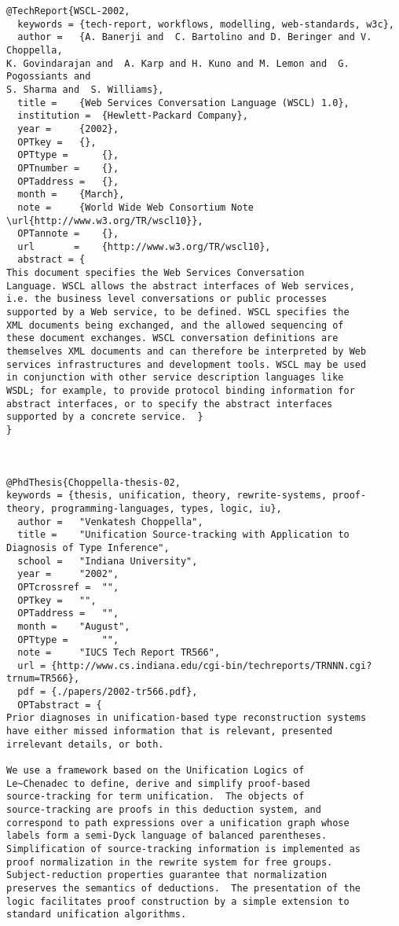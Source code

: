 \documentclass[11pt]{article}
\begin{document}
\begin{lstlisting}
@TechReport{WSCL-2002,
  keywords = {tech-report, workflows, modelling, web-standards, w3c},
  author = 	 {A. Banerji and  C. Bartolino and D. Beringer and V. Choppella,
K. Govindarajan and  A. Karp and H. Kuno and M. Lemon and  G. Pogossiants and
S. Sharma and  S. Williams},
  title = 	 {Web Services Conversation Language (WSCL) 1.0},
  institution =  {Hewlett-Packard Company},
  year = 	 {2002},
  OPTkey = 	 {},
  OPTtype = 	 {},
  OPTnumber = 	 {},
  OPTaddress = 	 {},
  month = 	 {March},
  note = 	 {World Wide Web Consortium Note \url{http://www.w3.org/TR/wscl10}},
  OPTannote = 	 {},
  url       =    {http://www.w3.org/TR/wscl10},
  abstract = {
This document specifies the Web Services Conversation
Language. WSCL allows the abstract interfaces of Web services,
i.e. the business level conversations or public processes
supported by a Web service, to be defined. WSCL specifies the
XML documents being exchanged, and the allowed sequencing of
these document exchanges. WSCL conversation definitions are
themselves XML documents and can therefore be interpreted by Web
services infrastructures and development tools. WSCL may be used
in conjunction with other service description languages like
WSDL; for example, to provide protocol binding information for
abstract interfaces, or to specify the abstract interfaces
supported by a concrete service.  }
}



@PhdThesis{Choppella-thesis-02,
keywords = {thesis, unification, theory, rewrite-systems, proof-theory, programming-languages, types, logic, iu},
  author = 	 "Venkatesh Choppella",
  title = 	 "Unification Source-tracking with Application to Diagnosis of Type Inference",
  school = 	 "Indiana University",
  year = 	 "2002",
  OPTcrossref =  "",
  OPTkey = 	 "",
  OPTaddress = 	 "",
  month = 	 "August",
  OPTtype = 	 "",
  note = 	 "IUCS Tech Report TR566",
  url = {http://www.cs.indiana.edu/cgi-bin/techreports/TRNNN.cgi?trnum=TR566},
  pdf = {./papers/2002-tr566.pdf},
  OPTabstract = {
Prior diagnoses in unification-based type reconstruction systems
have either missed information that is relevant, presented
irrelevant details, or both.  

We use a framework based on the Unification Logics of
Le~Chenadec to define, derive and simplify proof-based
source-tracking for term unification.  The objects of
source-tracking are proofs in this deduction system, and
correspond to path expressions over a unification graph whose
labels form a semi-Dyck language of balanced parentheses.
Simplification of source-tracking information is implemented as
proof normalization in the rewrite system for free groups.
Subject-reduction properties guarantee that normalization
preserves the semantics of deductions.  The presentation of the
logic facilitates proof construction by a simple extension to
standard unification algorithms.


\end{lstlisting}
\end{document}
